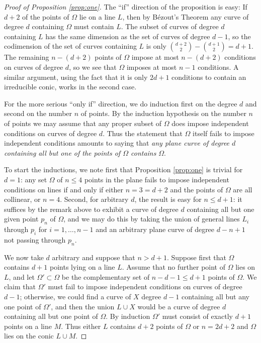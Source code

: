 \documentclass{bull-l}
\theoremstyle{pplain}
\theoremstyle{definition}
\begin{document}
\begin{proof}[Proof of Proposition \ref{prop:one}]
The ``if'' direction of the proposition is easy: If $d+2$ of the points of $
\Omega$ lie on a line $L$, then by B\'ezout's Theorem any curve of degree $d$
containing $\Omega$ must contain $L$.  The subset of curves of degree $d$
containing $L$ has the same dimension as the set of curves of degree $d-1$, so
the codimension of the set of curves containing $L$ is only
$\binom{d+2}{2}-\binom{d+1}{2}=d+1$. The remaining $n-(d+2) $ points of
$\Omega$ impose at most $n-(d+2)$ conditions on curves of degree $d$, so we see
that $\Omega$ imposes at most $n-1$ conditions.  A similar argument, using the
fact that it is only $2d+1$ conditions to contain an irreducible conic, works
in the second case.

For the more serious ``only if'' direction, we do induction first on the degree
$d$ and second on the number $n$ of points.  By the induction hypothesis on
the number $n$ of points we may assume that any proper subset of $\Omega$ does
impose independent conditions on curves of degree $d$.  Thus the statement that
$\Omega$ itself fails to impose independent conditions amounts to saying that
\emph{any plane curve of degree $d$ containing all but one of the points of $
\Omega$ contains} $\Omega$.

To start the inductions, we note first that Proposition \ref{prop:one} is
trivial for $d=1$: any set $\Omega$ of $n\le 4$ points in the plane fails to
impose independent conditions on lines if and only if either $n=3=d+2$ and the
points of $\Omega$ are all collinear, or $n=4$.  Second, for arbitrary $d$, the
result is easy for $n\le d+1$: it suffices by the remark above to exhibit a
curve of degree $d$ containing all but one given point $p_n$ of $\Omega$, and
we may do this by taking the union of general lines  $L_i$ through $p_i$ for
$i=1,\dots,n-1$ and an arbitrary plane curve of degree $d-n+1$ not passing
through $p_n$.

We now take $d$ arbitrary and suppose that $n>d+1$.  Suppose first that
$\Omega$ contains $d+1$ points lying on a line $L$.  Assume that no further 
point of $\Omega$ lies on $L$, and let $\Omega'\subset \Omega$ be the
complementary set of $n-d-1\le d+1$ points of $\Omega$.  We claim that
$\Omega'$ must fail to impose independent conditions on curves of degree $d-1$;
otherwise, we could find a curve of $X$ degree $d-1$ containing all but any one 
point of $\Omega'$, and then the union $L\cup X$ would be a curve of degree $d$
containing all but one point of $\Omega$.  By induction $\Omega'$ must consist
of exactly $d+1$ points on a line $M$.  Thus either $L$ contains $d+2$ points
of $\Omega$ or $n=2d+2$ and $\Omega$ lies on the conic $L\cup M$.


\end{proof}
\end{document}

